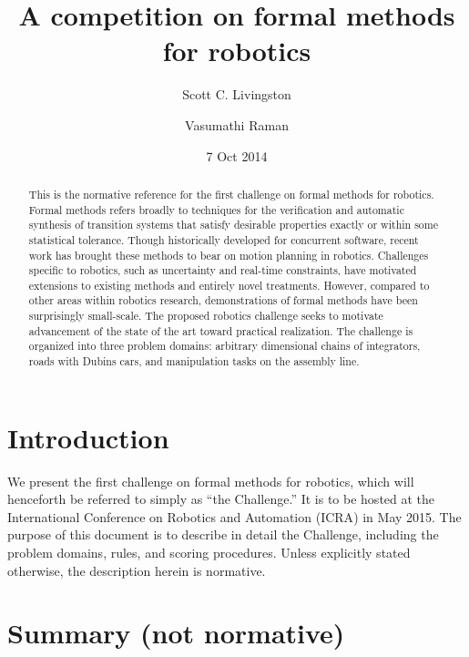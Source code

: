 \documentclass{amsart}
\theoremstyle{definition}
\begin{document}
\title{A competition on formal methods for robotics}
\author{Scott C. Livingston}
\author{Vasumathi Raman}
\date{7 Oct 2014}
\begin{abstract}
This is the normative reference for the first challenge on formal methods for
robotics.  Formal methods refers broadly to techniques for the verification and
automatic synthesis of transition systems that satisfy desirable properties
exactly or within some statistical tolerance.  Though historically developed for
concurrent software, recent work has brought these methods to bear on motion
planning in robotics.  Challenges specific to robotics, such as uncertainty and
real-time constraints, have motivated extensions to existing methods and
entirely novel treatments.  However, compared to other areas within robotics
research, demonstrations of formal methods have been surprisingly small-scale.
The proposed robotics challenge seeks to motivate advancement of the state of
the art toward practical realization.  The challenge is organized into three
problem domains: arbitrary dimensional chains of integrators, roads with Dubins
cars, and manipulation tasks on the assembly line.
\end{abstract}
\maketitle


\section{Introduction}

We present the first challenge on formal methods for robotics, which will
henceforth be referred to simply as ``the Challenge.''  It is to be hosted at
the International Conference on Robotics and Automation ({ICRA}) in May 2015.
The purpose of this document is to describe in detail the Challenge, including
the problem domains, rules, and scoring procedures.  Unless explicitly stated
otherwise, the description herein is normative.

\section{Summary (not normative)}
\end{document}
